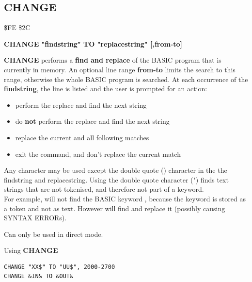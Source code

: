 \newpage
\subsection{CHANGE}
\begin{description}[leftmargin=2cm,style=nextline]
\item [Token:] \$FE \$2C
\item [Format:] {\bf CHANGE "findstring" TO "replacestring" [,from-to]}
\item [Usage:]  {\bf CHANGE} performs a {\bf find and replace} of the BASIC program
                that is currently in memory.
   An optional line range {\bf from-to} limits the search to this range,
   otherwise the whole BASIC program is searched.
   At each oc\-cur\-rence of the {\bf findstring}, the line is
   listed and the user is prompted for an action:
    \begin{itemize}
      \item {}  perform the replace and find the next string
      \item {}  do {\bf not} perform the replace and find the next string
      \item \megakey{*}  replace the current and all following matches
      \item {} exit the command, and don't replace the current match
    \end{itemize}
\item [Remarks:] Any character may be used except the
   double quote () character in the
   the findstring and replacestring.
   Using the double quote character (") finds text strings that are
   not tokenised, and therefore not part of a keyword. \\
   For example,  will not find
   the BASIC keyword , because the
   keyword is stored as a token and not as text.
   However  will
   find and replace it (possibly causing SYNTAX ERRORs).

   Can only be used in direct mode.

\item [Examples:] Using {\bf CHANGE}
\begin{tcolorbox}[colback=black,coltext=white]
\verbatimfont{\codefont}
\begin{verbatim}
CHANGE "XX$" TO "UU$", 2000-2700
CHANGE &IN& TO &OUT&
\end{verbatim}
\end{tcolorbox}
\end{description}

